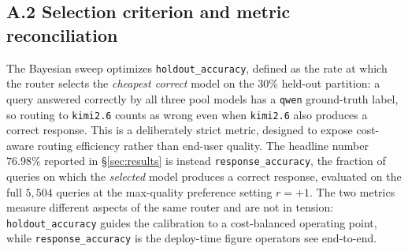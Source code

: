 \documentclass[twocolumn,10pt,a4paper]{article}
\begin{document}
\subsection*{A.2 Selection criterion and metric reconciliation}
The Bayesian sweep optimizes \texttt{holdout\_accuracy}, defined as the rate at which the router selects the \emph{cheapest correct} model on the $30\%$ held-out partition: a query answered correctly by all three pool models has a \texttt{qwen} ground-truth label, so routing to \texttt{kimi2.6} counts as wrong even when \texttt{kimi2.6} also produces a correct response. This is a deliberately strict metric, designed to expose cost-aware routing efficiency rather than end-user quality. The headline number $76.98\%$ reported in §\ref{sec:results} is instead \texttt{response\_accuracy}, the fraction of queries on which the \emph{selected} model produces a correct response, evaluated on the full $5{,}504$ queries at the max-quality preference setting $r{=}{+}1$. The two metrics measure different aspects of the same router and are not in tension: \texttt{holdout\_accuracy} guides the calibration to a cost-balanced operating point, while \texttt{response\_accuracy} is the deploy-time figure operators see end-to-end.
\end{document}
